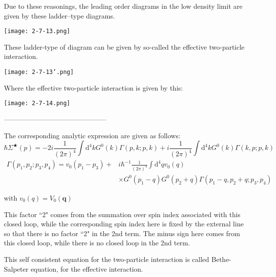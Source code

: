 Due to these reasonings, the leading order diagrams in the low density limit are given by these ladder--type diagrams.
\begin{center}
\texttt{[image: 2-7-13.png]}\label{Fig2.7.13}
\end{center}

These ladder-type of diagram can be given by so-called the effective two-particle interaction.
\begin{center}
\texttt{[image: 2-7-13'.png]}\label{Fig2.7.13'}
\begin{equation} \label{Eqs2.7.4}\end{equation}
\end{center}

Where the effective two-particle interaction is given by this:
\begin{center}
\texttt{[image: 2-7-14.png]}\label{Fig2.7.14}
\begin{equation} \label{Eqs2.7.5}\end{equation}
\end{center}
\begin{center}---------------------------------------------\end{center}
The corresponding analytic expression are given as follows:
\begin{equation*} \label{Eqs2.7.4'} \tag{2.7.4'} \hbar\Sigma^{\bigstar}(p) = -2 i \frac{1}{(2\pi)^4} \int \mathrm{d}^4 k G^0(k) \Gamma(p,k;p,k)+i \frac{1}{(2\pi)^4}\int \mathrm{d}^4 k G^0(k) \Gamma(k,p;p,k) \end{equation*}
\begin{equation} \label{Eqs2.7.6} \begin{split}
\Gamma(p_1,p_2;p_3,p_4) = v_0(p_1-p_3) + &i \hbar^{-1} \frac{1}{(2\pi)^4} \int \mathrm{d}^4 q v_0(q) \\
&\times G^0(p_1-q)G^0(p_2+q)\Gamma(p_1-q,p_2+q;p_3,p_4)
\end{split}\end{equation}

with $v_0(q) = V_0(\mathbf{q})$

This factor ``2" comes from the summation over spin index associated with this closed loop, while the corresponding spin index here is fixed by the external line so that there is no factor ``2" in the 2nd term. The minus sign here comes from this closed loop, while there is no closed loop in the 2nd term.

This self consistent equation for the two-particle interaction is called Bethe-Salpeter equation, for the effective interaction.

